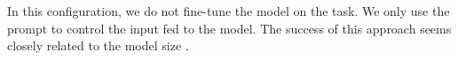 In this configuration, we do not fine-tune the model on the task. We only use the prompt to control the input fed to the model. The success of this approach seems closely related to the model size \parencite{brown_20}.




